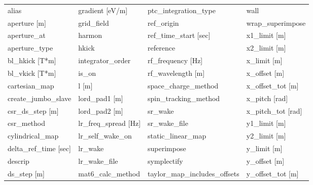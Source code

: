  \begin{tabular}{llll} \toprule
alias                            & gradient [eV/m]                  & ptc_integration_type             & wall                             \\
aperture [m]                     & grid_field                       & ref_origin                       & wrap_superimpose                 \\
aperture_at                      & harmon                           & ref_time_start [sec]             & x1_limit [m]                     \\
aperture_type                    & hkick                            & reference                        & x2_limit [m]                     \\
bl_hkick [T*m]                   & integrator_order                 & rf_frequency [Hz]                & x_limit [m]                      \\
bl_vkick [T*m]                   & is_on                            & rf_wavelength [m]                & x_offset [m]                     \\
cartesian_map                    & l [m]                            & space_charge_method              & x_offset_tot [m]                 \\
create_jumbo_slave               & lord_pad1 [m]                    & spin_tracking_method             & x_pitch [rad]                    \\
csr_ds_step [m]                  & lord_pad2 [m]                    & sr_wake                          & x_pitch_tot [rad]                \\
csr_method                       & lr_freq_spread [Hz]              & sr_wake_file                     & y1_limit [m]                     \\
cylindrical_map                  & lr_self_wake_on                  & static_linear_map                & y2_limit [m]                     \\
delta_ref_time [sec]             & lr_wake                          & superimpose                      & y_limit [m]                      \\
descrip                          & lr_wake_file                     & symplectify                      & y_offset [m]                     \\
ds_step [m]                      & mat6_calc_method                 & taylor_map_includes_offsets      & y_offset_tot [m]                 \\

\end{tabular}
